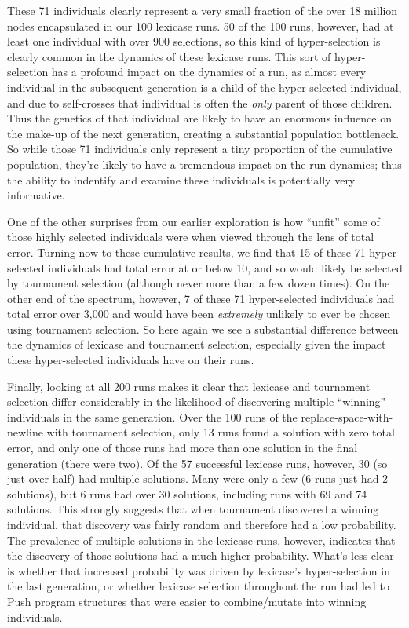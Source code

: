 These 71 individuals clearly represent a very small fraction of the over 18 million nodes encapsulated in our 100 lexicase
runs. 50 of
the 100 runs, however, had at least one individual with over 900 selections, so this kind of 
hyper-selection is clearly common in the dynamics of these lexicase runs. This sort of hyper-selection 
has a profound impact on the dynamics of a run, as almost every individual in the subsequent generation is a child of
the hyper-selected individual, and due to self-crosses that individual is often the \emph{only} parent of those children. Thus
the genetics of that individual are likely to have an enormous influence on the make-up of the next generation, creating
a substantial population bottleneck. So while those 71 individuals only represent a tiny proportion of
the cumulative population, they're likely to have a tremendous impact on the run dynamics; thus the ability to indentify and
examine these individuals is potentially very informative.

One of the other surprises from our earlier exploration is how ``unfit'' some of those highly selected individuals were when
viewed through the lens of total error. Turning now to these cumulative results, we find that 15 of these 71 hyper-selected
individuals had total error at or below 10, and so would likely be selected by tournament selection (although never more 
than a few dozen times). On the other end of the spectrum, however, 7 of these 71 hyper-selected individuals had total 
error over 3,000 and would have been \emph{extremely} unlikely to ever be chosen using tournament selection. So here
again we see a substantial difference between the dynamics of lexicase and tournament selection, especially given the
impact these hyper-selected individuals have on their runs.

Finally, looking at all 200 runs makes it clear that lexicase and tournament selection differ considerably in the 
likelihood of discovering multiple ``winning'' individuals in the same generation. Over the 100 runs of the 
replace-space-with-newline with tournament selection, only 13 runs found a solution with zero total error, and only one
of those runs had more than one solution in the final generation (there were two). Of the 57 successful lexicase runs, 
however, 30 (so just over half) had multiple solutions. Many were only a few (6 runs just had 2 solutions), but 6 runs had
over 30 solutions, including runs with 69 and 74 solutions. This strongly suggests that when tournament discovered a
winning individual, that discovery was fairly random and therefore had a low probability. The prevalence of multiple
solutions in the lexicase runs, however, indicates that the discovery of those solutions had a much higher probability.
What's less clear is whether that increased probability was driven by lexicase's hyper-selection in the last generation,
or whether lexicase selection throughout the run had led to Push program structures that were easier to combine/mutate
into winning individuals.

